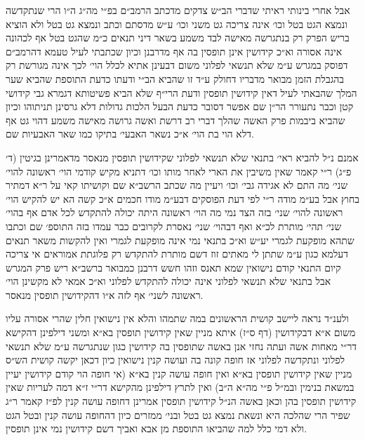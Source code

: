 \documentclass[12pt, openany]{book}
\begin{document}
\begin{multicols}{2}
אבל אחרי בינותי ראיתי שדברי הב״ש צדקים מדכתב הרמב״ם בפ״י מה״ג ה״ו הרי שנתקדשה ונמצא הגט בטל וכו׳ אינה צריכה גט משני וכו׳ ע״ש מדסתם וכתב ונמצא גט בטל ולא הוציא בריש הפרק רק בנתגרשה מאישה לבד משמע בשאר דיני תנאים כ״מ שהגט בטל אף לכהונה אינה אסורה וא״כ קידושין אינן תופסין בה אף מדרבנן וכיון שכתבתי לעיל טעמא דהרמב״ם דפוסק במגרש ע״מ שלא תנשאי לפלוני משום דבעינן אתיא לכלל הוי׳ לכך אינה מגורשת רק בהגבלת הזמן מבואר מדבריו דחולק ע״ד זו שהביא הב״י ודעתו כדעת התוספת שהביא שער המלך שהבאתי לעיל דאין קידושין תופסין ודעת הרי״ף שלא הביא פשיטותא דגמרא גבי קידושי קטן וכבר נתעורר הר״ן שם אפשר דסובר כדעת הבעל הלכות גדולות דלא גרסינן תניתוהו וכיון שהביא ביבמות פרק האשה שהלך דברי רב דרשת ואשה גרושה מאישה משמע דהוי גט אף דלא הוי בת הוי׳ א״כ נשאר האבעי׳ בתיקו כמו שאר האבעיות שם.\\\vspace{0pt}

אמנם נ״ל להביא ראי׳ בתנאי שלא תנשאי לפלוני שקידושין תופסין מנאסר מדאמרינן בגיטין (ד׳ פ״ג) ר״י קאמר שאין משיבין את הארי לאחר מותו וכו׳ דתניא מקיש קודמי הוי׳ ראשונה להוי׳ שני׳ מה התם לא אגידה גבי׳ וכו׳ ויעיין מה שכתב הרשב״א שם וקושיתו קאי על ר״א דמתיר בחוץ אבל בע״מ מודה ר״י לפי דעת הפוסקים דבע״מ מודו חכמים א״כ קשה הא יש להקיש הוי׳ ראשונה להוי׳ שני׳ בזה הצד נמי מה הוי׳ ראשונה היתה יכולה להתקדש לכל אדם אף בהוי׳ שני׳ תהי׳ מותרת לכ״א ואף דבהוי׳ שני׳ נאסרת לקרובים כבר עמדו בזה התוספ׳ שם וכתבו שתהא מופקעת לגמרי יע״ש וא״כ בתנאי נמי אינה מופקעת לגמרי ואין להקשות משאר תנאים דעלמא כגון ע״מ שתתן לי מאתים זוז דשם מותרת להתקדש רק פלוגתת אמוראים אי צריכה קיום התנאי קודם נישואין שמא תאנס וזהו חשש דרבנן כמבואר ברשב״א ריש פרק המגרש אבל בתנאי שלא תנשאי לפלוני אינה יכולה להתקדש לפלוני וא״כ אמאי לא מקשינן הוי׳ ראשונה לשני׳ אף לזה א״ו דהקידושין תופסין מנאסר.\\\vspace{0pt}

ולענ״ד נראה ליישב קושית הראשונים במה שתמהו והלא אין נישואין חלין שהרי אסורה עליו משום א״א דבקידושין (דף ס״ז) איתא מניין שאין קידושין תופסין בא״א ומשני דילפינן דהקישא דר״י מאחות אשה ועתה נחזי אנן באשה שתופסין בה קידושין כגון שנתגרשה ע״מ שלא תנשאי לפלוני ונתקדשה לפלוני אז חופה קונה בה ועושה קנין נישואין כיון דכאן יקשה קושית הש״ס מניין שאין קידושין תופסין בא״א ואין חופה עושה קנין בא״א (אי חופה הוי קודם קידושין יעיין במשאת בנימין ובמ״ל פ״י מה״א ה״ב) ואין לתרץ דילפינן מהקישא דר״י ז״א דמה לעריות שאין קידושין תופסין בהן וכאן באשה הנ״ל קידושין תופסין אמרינן דחופה עושה קנין לפ״ז קאמר ר״ג שפיר הרי שהלכה היא ונשאת נמצא גט בטל ובני׳ ממזרים כיון דהחופה עושה קנין ובטל הגט ולא דמי כלל למה שהביאו התוספת מן אבא ואביך דשם קידושין נמי אינן תופסין.\\\vspace{0pt}


\end{multicols}
\end{document}
